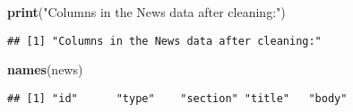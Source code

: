 \documentclass[]{article}
\newenvironment{Shaded}{\begin{snugshade}}{\end{snugshade}}
\newcommand{\KeywordTok}[1]{\textcolor[rgb]{0.13,0.29,0.53}{\textbf{#1}}}
\newcommand{\DataTypeTok}[1]{\textcolor[rgb]{0.13,0.29,0.53}{#1}}
\newcommand{\StringTok}[1]{\textcolor[rgb]{0.31,0.60,0.02}{#1}}
\newcommand{\OperatorTok}[1]{\textcolor[rgb]{0.81,0.36,0.00}{\textbf{#1}}}
\newcommand{\NormalTok}[1]{#1}
\begin{document}

\begin{Shaded}
\begin{Highlighting}[]
\KeywordTok{print}\NormalTok{(}\StringTok{"Columns in the News data after cleaning:"}\NormalTok{)}
\end{Highlighting}
\end{Shaded}

\begin{verbatim}
## [1] "Columns in the News data after cleaning:"
\end{verbatim}

\begin{Shaded}
\begin{Highlighting}[]
\KeywordTok{names}\NormalTok{(news)}
\end{Highlighting}
\end{Shaded}

\begin{verbatim}
## [1] "id"      "type"    "section" "title"   "body"
\end{verbatim}

\begin{Shaded}
\end{Shaded}

\end{document}
